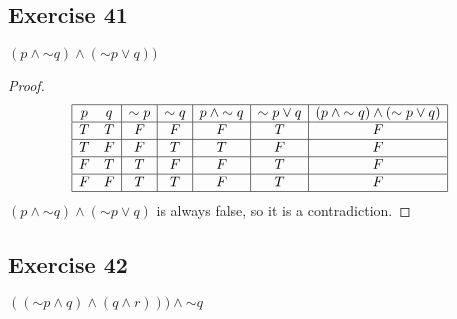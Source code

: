 \documentclass[14pt]{extarticle}
\begin{document}
\subsection{Exercise 41}
$(p \wedge {\sim q}) \wedge ({\sim p} \vee q))$

\begin{proof}
    $$
        \begin{array}{|cc|c|c|c|c|c|}
            \hline
            p & q & {\sim p} & {\sim q} & p \wedge {\sim q} & {\sim p} \vee q & (p \wedge {\sim q}) \wedge ({\sim p} \vee q) \\
            \hline
            T & T & F        & F        & F                 & T               & F                                            \\
            \hline
            T & F & F        & T        & T                 & F               & F                                            \\
            \hline
            F & T & T        & F        & F                 & T               & F                                            \\
            \hline
            F & F & T        & T        & F                 & T               & F                                            \\
            \hline
        \end{array}
    $$
    $(p \wedge {\sim q}) \wedge ({\sim p} \vee q)$ is always false, so it is a contradiction.
\end{proof}

\subsection{Exercise 42} $(({\sim p} \wedge q) \wedge (q \wedge r))) \wedge
    {\sim q}$
\end{document}
